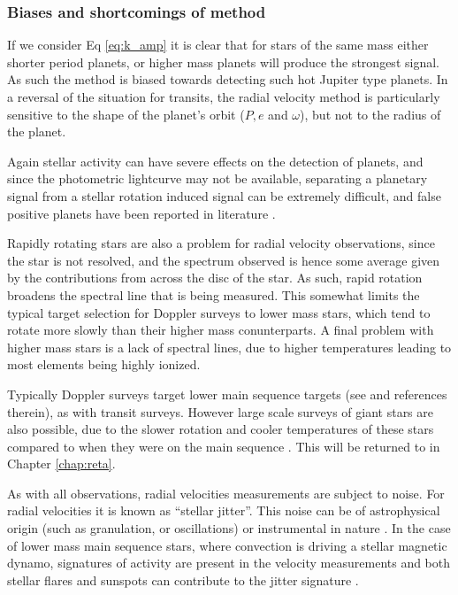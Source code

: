 \subsubsection{Biases and shortcomings of method}\label{sec:doppler_probs}
If we consider Eq \ref{eq:k_amp} it is clear that for stars of the same mass either shorter period planets, or higher mass planets will produce the strongest signal. As such the method is biased towards detecting such hot Jupiter type planets. In a reversal of the situation for transits, the radial velocity method is particularly sensitive to the shape of the planet's orbit ($P, e$ and $\omega$), but not to the radius of the planet.

Again stellar activity can have severe effects on the detection of planets, and since the photometric lightcurve may not be available, separating a planetary signal from a stellar rotation induced signal can be extremely difficult, and false positive planets have been reported in literature \citep{2014Robertson}. 

Rapidly rotating stars are also a problem for radial velocity observations, since the star is not resolved, and the spectrum observed is hence some average given by the contributions from across the disc of the star. As such, rapid rotation broadens the spectral line that is being measured. This somewhat limits the typical target selection for Doppler surveys to lower mass stars, which tend to rotate more slowly than their higher mass conunterparts. A final problem with higher mass stars is a lack of spectral lines, due to higher temperatures leading to most elements being highly ionized.  

Typically Doppler surveys target lower main sequence targets (see \cite{2017Butler} and references therein), as with transit surveys. However large scale surveys of giant stars are also possible, due to the slower rotation and cooler temperatures of these stars compared to when they were on the main sequence \citep{2004Setiawan,2007Dollinger,Johnson2007a,2014Lee}. This will be returned to in Chapter \ref{chap:reta}. 

As with all observations, radial velocities measurements are subject to noise. For radial velocities it is known as ``stellar jitter''. This noise can be of astrophysical origin (such as granulation, or oscillations) or instrumental in nature \citep{2005Wright,2010Isaacson}. In the case of lower mass main sequence stars, where convection is driving a stellar magnetic dynamo, signatures of activity are present in the velocity measurements and both stellar flares and sunspots can contribute to the jitter signature \citep{1998Saar,2017Oshagh}. 

